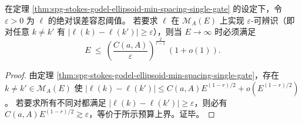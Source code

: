 \begin{corollary}\label{cor:spg-single-gate-identifiability-critical-energy}
在定理 \ref{thm:spg-stokes-godel-ellipsoid-min-spacing-single-gate} 的设定下，令 \(\varepsilon>0\) 为 \(\ell\) 的绝对误差容忍阈值。
若要求 \(\ell\) 在 \(\mathcal M_A(E)\) 上实现 \(\varepsilon\)-可辨识（即对任意 \(k\neq k'\) 有 \(|\ell(k)-\ell(k')|\ge \varepsilon\)），则当 \(E\to\infty\) 时必须满足
\[
E\ \le\ \left(\frac{C(a,A)}{\varepsilon}\right)^{\!\frac{2}{r-1}}\,(1+o(1)).
\]
\end{corollary}
\begin{proof}
由定理 \ref{thm:spg-stokes-godel-ellipsoid-min-spacing-single-gate}，存在 \(k\neq k'\in\mathcal M_A(E)\) 使
\(
|\ell(k)-\ell(k')|
\le
C(a,A)E^{(1-r)/2}+o(E^{(1-r)/2})
\)。
若要求所有不同对都满足 \(|\ell(k)-\ell(k')|\ge \varepsilon\)，则必有 \(C(a,A)E^{(1-r)/2}\gtrsim \varepsilon\)，等价于所示预算上界。证毕。
\end{proof}

\endinput
